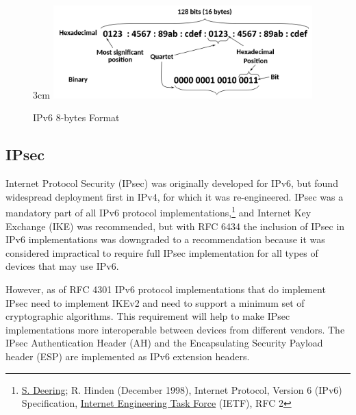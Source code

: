 \documentclass[a4paper,12pt]{article}
\begin{document}
\begin{figure}{3cm}
\centering
\includegraphics[width=10cm]{./IPv6.PNG}
\caption{IPv6 8-bytes Format }\label{wrap-fig:7}
\end{figure}


\subsection{IPsec}
Internet Protocol Security (IPsec) was originally developed for IPv6, but found widespread deployment first in IPv4, for which it was re-engineered. IPsec was a mandatory part of all IPv6 protocol implementations,\footnote{\label{note1}\href{https://en.wikipedia.org/wiki/Steve_Deering}{S. Deering}; R. Hinden (December 1998), Internet Protocol, Version 6 (IPv6) Specification, \href{https://en.wikipedia.org/wiki/Internet_Engineering_Task_Force}{Internet Engineering Task Force} (IETF), RFC 2} and Internet Key Exchange (IKE) was recommended, but with RFC 6434 the inclusion of IPsec in IPv6 implementations was downgraded to a recommendation because it was considered impractical to require full IPsec implementation for all types of devices that may use IPv6.

However, as of RFC 4301 IPv6 protocol implementations that do implement IPsec need to implement IKEv2 and need to support a minimum set of cryptographic algorithms. This requirement will help to make IPsec implementations more interoperable between devices from different vendors. The IPsec Authentication Header (AH) and the Encapsulating Security Payload header (ESP) are implemented as IPv6 extension headers.\footnotemark{}


\end{document}
